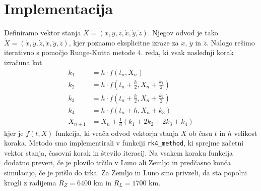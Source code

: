 \documentclass[11pt, titlepage]{article}
\begin{document}
\section{Implementacija}
Definiramo vektor stanja $X = (x, y, z, \dot{x}, \dot{y}, \dot{z})$. Njegov odvod je tako $\dot{X} = (\dot{x}, \dot{y}, \dot{z}, \ddot{x}, \ddot{y}, \ddot{z})$, kjer poznamo eksplicitne izraze za $\ddot{x}$, $\ddot{y}$ in $\ddot{z}$.
Nalogo rešimo iterativno s pomočjo Runge-Kutta metode 4. reda, ki vsak naslednji korak izračuna kot
\begin{align*}
k_1 &= h \cdot f(t_n, X_n) \\
k_2 &= h \cdot f(t_n + \frac{h}{2}, X_n + \frac{k_1}{2}) \\
k_3 &= h \cdot f(t_n + \frac{h}{2}, X_n + \frac{k_2}{2}) \\
k_4 &= h \cdot f(t_n + h, X_n + k_3) \\
X_{n+1} &= X_n + \frac{1}{6}(k_1 + 2k_2 + 2k_3 + k_4)
\end{align*}
kjer je $f(t, X)$ funkcija, ki vrača odvod vektorja stanja $X$ ob času $t$ in $h$ velikost koraka. Metodo smo implementirali v funkciji \texttt{rk4\_method}, ki sprejme začetni vektor stanja, časovni korak in število iteracij. Na vsakem koraku funkcija dodatno preveri,
če je plovilo trčilo v Luno ali Zemljo in predčasno konča simulacijo, če je prišlo do trka. Za Zemljo in Luno smo privzeli, da sta popolni krogli z radijema $R_Z = 6400 \text{ km}$ in $R_L = 1700 \text{ km}$.
\end{document}

